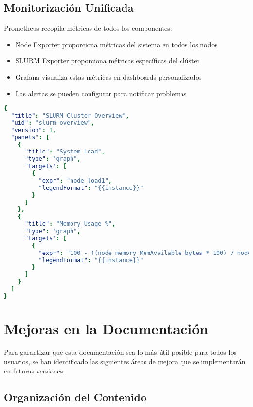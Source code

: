 \documentclass[12pt,a4paper]{article}
\begin{document}
\subsection{Monitorización Unificada}

Prometheus recopila métricas de todos los componentes:

\begin{itemize}[leftmargin=*]
    \item Node Exporter proporciona métricas del sistema en todos los nodos
    \item SLURM Exporter proporciona métricas específicas del clúster
    \item Grafana visualiza estas métricas en dashboards personalizados
    \item Las alertas se pueden configurar para notificar problemas
\end{itemize}

\begin{lstlisting}[language=yaml, caption=Configuración de dashboard de SLURM en Grafana]
{
  "title": "SLURM Cluster Overview",
  "uid": "slurm-overview",
  "version": 1,
  "panels": [
    {
      "title": "System Load",
      "type": "graph",
      "targets": [
        {
          "expr": "node_load1",
          "legendFormat": "{{instance}}"
        }
      ]
    },
    {
      "title": "Memory Usage %",
      "type": "graph",
      "targets": [
        {
          "expr": "100 - ((node_memory_MemAvailable_bytes * 100) / node_memory_MemTotal_bytes)",
          "legendFormat": "{{instance}}"
        }
      ]
    }
  ]
}
\end{lstlisting}

\section{Mejoras en la Documentación}

Para garantizar que esta documentación sea lo más útil posible para todos los usuarios, se han identificado las siguientes áreas de mejora que se implementarán en futuras versiones:

\subsection{Organización del Contenido}
\end{document}
